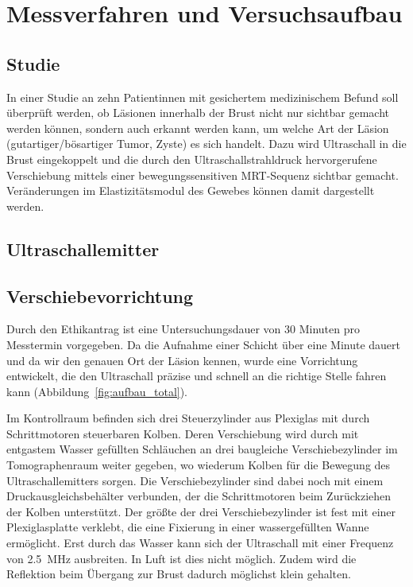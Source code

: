 \documentclass[
    11pt,
    ngerman
]{scrreprt}
\begin{document}
\chapter{Messverfahren und Versuchsaufbau}

\section{Studie}

In einer Studie an zehn Patientinnen mit gesichertem medizinischem Befund soll
überprüft werden, ob Läsionen innerhalb der Brust nicht nur sichtbar gemacht
werden können, sondern auch erkannt werden kann, um welche Art der Läsion
(gutartiger/bösartiger Tumor, Zyste) es sich handelt. Dazu wird Ultraschall in
die Brust eingekoppelt und die durch den Ultraschallstrahldruck hervorgerufene
Verschiebung mittels einer bewegungssensitiven MRT-Sequenz sichtbar gemacht.
Veränderungen im Elastizitätsmodul des Gewebes können damit dargestellt werden.

\section{Ultraschallemitter}


\section{Verschiebevorrichtung}

Durch den Ethikantrag ist eine Untersuchungsdauer von 30 Minuten pro Messtermin
vorgegeben. Da die Aufnahme einer Schicht über eine Minute dauert und da wir
den genauen Ort der Läsion kennen, wurde eine Vorrichtung entwickelt, die den
Ultraschall präzise und schnell an die richtige Stelle fahren kann
(Abbildung~\ref{fig:aufbau_total}).

Im Kontrollraum befinden sich drei Steuerzylinder aus Plexiglas mit durch
Schrittmotoren steuerbaren Kolben. Deren Verschiebung wird durch mit
entgastem Wasser gefüllten Schläuchen an drei baugleiche Verschiebezylinder im
Tomographenraum weiter gegeben, wo wiederum Kolben für die Bewegung des
Ultraschallemitters sorgen. Die Verschiebezylinder sind dabei noch mit einem
Druckausgleichsbehälter verbunden, der die Schrittmotoren beim Zurückziehen der
Kolben unterstützt. Der größte der drei Verschiebezylinder ist fest mit einer
Plexiglasplatte verklebt, die eine Fixierung in einer wassergefüllten Wanne
ermöglicht. Erst durch das Wasser kann sich der Ultraschall mit einer Frequenz
von \SI{2.5}{\mega\hertz} ausbreiten. In Luft ist dies nicht möglich. Zudem wird
die Reflektion beim Übergang zur Brust dadurch möglichst klein gehalten.
\end{document}
